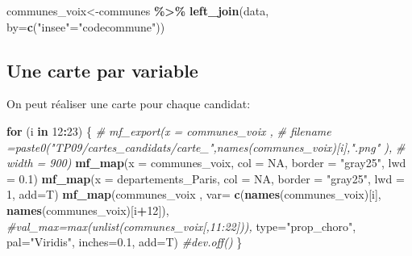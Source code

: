 \documentclass[
]{book}
\newenvironment{Shaded}{\begin{snugshade}}{\end{snugshade}}
\newcommand{\AttributeTok}[1]{\textcolor[rgb]{0.13,0.29,0.53}{#1}}
\newcommand{\CommentTok}[1]{\textcolor[rgb]{0.56,0.35,0.01}{\textit{#1}}}
\newcommand{\ConstantTok}[1]{\textcolor[rgb]{0.56,0.35,0.01}{#1}}
\newcommand{\ControlFlowTok}[1]{\textcolor[rgb]{0.13,0.29,0.53}{\textbf{#1}}}
\newcommand{\DecValTok}[1]{\textcolor[rgb]{0.00,0.00,0.81}{#1}}
\newcommand{\FloatTok}[1]{\textcolor[rgb]{0.00,0.00,0.81}{#1}}
\newcommand{\FunctionTok}[1]{\textcolor[rgb]{0.13,0.29,0.53}{\textbf{#1}}}
\newcommand{\NormalTok}[1]{#1}
\newcommand{\OtherTok}[1]{\textcolor[rgb]{0.56,0.35,0.01}{#1}}
\newcommand{\SpecialCharTok}[1]{\textcolor[rgb]{0.81,0.36,0.00}{\textbf{#1}}}
\newcommand{\StringTok}[1]{\textcolor[rgb]{0.31,0.60,0.02}{#1}}
\begin{document}
\begin{Shaded}
\begin{Highlighting}[]
\NormalTok{communes\_voix}\OtherTok{\textless{}{-}}\NormalTok{communes }\SpecialCharTok{\%\textgreater{}\%}
  \FunctionTok{left\_join}\NormalTok{(data, }\AttributeTok{by=}\FunctionTok{c}\NormalTok{(}\StringTok{"insee"}\OtherTok{=}\StringTok{"codecommune"}\NormalTok{))}
\end{Highlighting}
\end{Shaded}

\hypertarget{une-carte-par-variable}{%
\subsection{Une carte par variable}\label{une-carte-par-variable}}

On peut réaliser une carte pour chaque candidat:

\begin{Shaded}
\begin{Highlighting}[]
\ControlFlowTok{for}\NormalTok{ (i }\ControlFlowTok{in} \DecValTok{12}\SpecialCharTok{:}\DecValTok{23}\NormalTok{) \{}
  \CommentTok{\# mf\_export(x = communes\_voix ,}
  \CommentTok{\#           filename =paste0("TP09/cartes\_candidats/carte\_",names(communes\_voix)[i],".png" ),}
  \CommentTok{\#           width = 900)}
  \FunctionTok{mf\_map}\NormalTok{(}\AttributeTok{x =}\NormalTok{ communes\_voix, }\AttributeTok{col =} \ConstantTok{NA}\NormalTok{, }\AttributeTok{border =} \StringTok{"gray25"}\NormalTok{, }\AttributeTok{lwd =} \FloatTok{0.1}\NormalTok{)}
  \FunctionTok{mf\_map}\NormalTok{(}\AttributeTok{x =}\NormalTok{ departements\_Paris, }\AttributeTok{col =} \ConstantTok{NA}\NormalTok{, }\AttributeTok{border =} \StringTok{"gray25"}\NormalTok{, }\AttributeTok{lwd =} \DecValTok{1}\NormalTok{, }\AttributeTok{add=}\NormalTok{T)}
  \FunctionTok{mf\_map}\NormalTok{(communes\_voix ,}
         \AttributeTok{var=} \FunctionTok{c}\NormalTok{(}\FunctionTok{names}\NormalTok{(communes\_voix)[i], }\FunctionTok{names}\NormalTok{(communes\_voix)[i}\SpecialCharTok{+}\DecValTok{12}\NormalTok{]),}
         \CommentTok{\#val\_max=max(unlist(communes\_voix[,11:22])),}
         \AttributeTok{type=}\StringTok{"prop\_choro"}\NormalTok{,}
         \AttributeTok{pal=}\StringTok{"Viridis"}\NormalTok{,}
         \AttributeTok{inches=}\FloatTok{0.1}\NormalTok{,}
         \AttributeTok{add=}\NormalTok{T)}
  \CommentTok{\#dev.off()}
\NormalTok{\}}
\end{Highlighting}
\end{Shaded}
\end{document}
